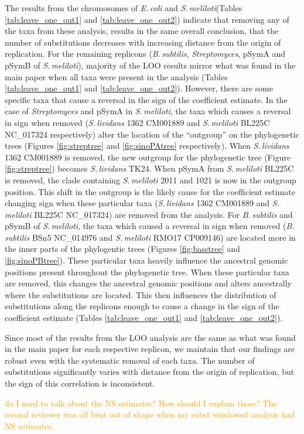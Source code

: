 \documentclass[11pt]{article}
\newcommand{\smel}{\textit{S.\,meliloti}\xspace}
\newcommand{\strep}{\textit{Streptomyces}\xspace}
\newcommand{\ecol}{\textit{E.\,coli}\xspace}
\newcommand{\bass}{\textit{B.\,subtilis}\xspace}
\newcommand{\sliv}{\textit{S.\,lividans}\xspace}
\newcommand{\pa}{pSymA\xspace}
\newcommand{\pb}{pSymB\xspace}
\begin{document}
The results from the chromosomes of \ecol and \smel (Tables \ref{tab:leave_one_out1} and \ref{tab:leave_one_out2}) indicate that removing any of the taxa from these analysis, results in the same overall conclusion, that the number of substitutions decreases with increasing distance from the origin of replication.
For the remaining replicons (\bass, \strep, \pa and \pb of \smel), majority of the LOO results mirror what was found in the main paper when all taxa were present in the analysis (Tables \ref{tab:leave_one_out1} and \ref{tab:leave_one_out2}).
However, there are some specific taxa that cause a reversal in the sign of the coefficient estimate.
In the case of \strep and \pa in \smel, the taxa which causes a reversal in sign when removed (\sliv 1362 CM001889 and \smel BL225C NC\_017324 respectively) alter the location of the ``outgroup'' on the phylogenetic trees (Figures \ref{fig:streptree} and \ref{fig:sinoPAtree} respectively).
When \sliv 1362 CM001889 is removed, the new outgroup for the phylogenetic tree (Figure \ref{fig:streptree}) becomes \sliv TK24.
When \pa from \smel BL225C is removed, the clade containing \smel 2011 and 1021 is now in the outgroup position.
This shift in the outgroup is the likely cause for the coefficient estimate changing sign when these particular taxa (\sliv 1362 CM001889 and \smel BL225C NC\_017324) are removed from the analysis.
For \bass and \pb of \smel, the taxa which caused a reversal in sign when removed (\bass BSn5 NC\_014976 and \smel RMO17 CP009146) are located more in the inner parts of the phylogentic trees (Figures \ref{fig:basstree} and \ref{fig:sinoPBtree}).
These particular taxa heavily influence the ancestral genomic positions present throughout the phylogenetic tree.
When these particular taxa are removed, this changes the ancestral genomic positions and alters ancestrally where the substitutions are located.
This then influences the distribution of substitutions along the replicons enough to cause a change in the sign of the coefficient estimate (Tables \ref{tab:leave_one_out1} and \ref{tab:leave_one_out2}).

Since most of the results from the LOO analysis are the same as what was found in the main paper for each respective replicon, we maintain that our findings are robust even with the systematic removal of each taxa.
The number of substitutions significantly varies with distance from the origin of replication, but the sign of this correlation is inconsistent.

\textcolor{orange}{do I need to talk about the NS estimates? How should I explain those? The second reviewer was all bent out of shape when my subst windowed analysis had NS estimates.}
\end{document}
